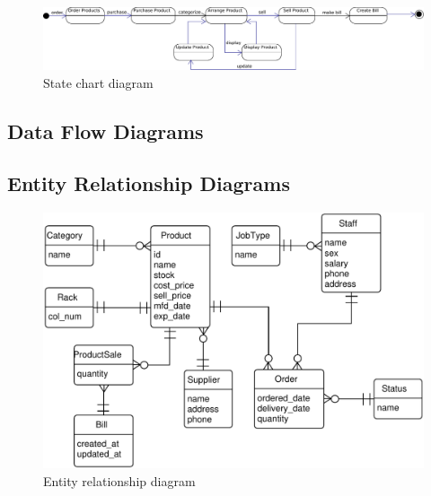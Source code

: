 \begin{figure}[h!]\centering
  \includegraphics[width=\textwidth+1cm]{fig/state-chart}
  \caption{State chart diagram}\label{fig:state-chart}
\end{figure}


\subsection{Data Flow Diagrams}

\subsection{Entity Relationship Diagrams}

\begin{figure}[h!]\centering
  \includegraphics[width=\textwidth]{fig/erd}
  \caption{Entity relationship diagram}\label{fig:erd}
\end{figure}
